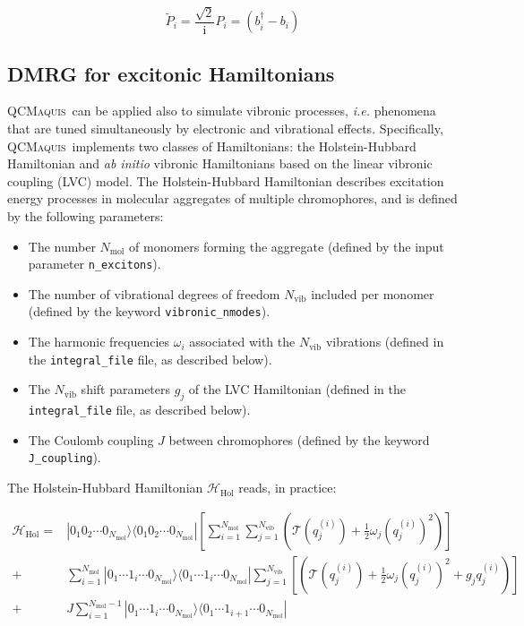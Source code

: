 \documentclass[bibliography=totoc,12pt,a4paper]{scrartcl}
\newcommand{\qcm}{\textsc{QCMaquis}}
\begin{document}
\begin{equation}
  \tilde{P}_i = \frac{\sqrt{2}}{\mathrm{i}} P_i = \left( b_i^\dagger - b_i \right)
  \label{eq:ScaledNM_Momentum}
\end{equation}

\subsection{DMRG for excitonic Hamiltonians}
\label{sec:excitonic}

\qcm\ can be applied also to simulate vibronic processes, \textit{i.e.} phenomena that are tuned simultaneously by electronic and vibrational effects.
Specifically, \qcm\ implements two classes of Hamiltonians: the Holstein-Hubbard Hamiltonian and \textit{ab initio} vibronic Hamiltonians based on the linear vibronic coupling (LVC) model.
The Holstein-Hubbard Hamiltonian describes excitation energy processes in molecular aggregates of multiple chromophores, and is defined by the following parameters:

\begin{itemize}
  \item The number $N_\text{mol}$ of monomers forming the aggregate (defined by the input parameter \texttt{n\_excitons}).
  \item The number of vibrational degrees of freedom $N_\text{vib}$ included per monomer (defined by the keyword \texttt{vibronic\_nmodes}).
  \item The harmonic frequencies $\omega_i$ associated with the $N_\text{vib}$ vibrations (defined in the \texttt{integral\_file} file, as described below).
  \item The $N_\text{vib}$ shift parameters $g_j$ of the LVC Hamiltonian (defined in the \texttt{integral\_file} file, as described below).
  \item The Coulomb coupling $J$ between chromophores (defined by the keyword \texttt{J\_coupling}).
\end{itemize}

The Holstein-Hubbard Hamiltonian $\mathcal{H}_\text{Hol}$ reads, in practice:

\begin{equation}
 \begin{aligned}
  \mathcal{H}_\text{Hol} =& | 0_1 0_2 \cdots 0_{N_\text{mol}} \rangle \langle 0_1 0_2 \cdots 0_{N_\text{mol}} |
	\left[ \sum_{i=1}^{N_\text{mol}} \sum_{j=1}^{N_\text{vib}} 
		   \left( \mathcal{T}(q_{j}^{(i)}) + \frac{1}{2} \omega_j \left( q_j^{(i)} \right)^2 \right)
	\right] \\
	+& \sum_{i=1}^{N_\text{mol}} | 0_1 \cdots 1_i \cdots 0_{N_\text{mol}} \rangle 
								 \langle 0_1 \cdots 1_i \cdots 0_{N_\text{mol}} | 
	   \sum_{j=1}^{N_\text{vib}} \left[ 
	   \left( \mathcal{T}(q_{j}^{(i)}) 
			+ \frac{1}{2} \omega_j \left( q_j^{(i)} \right)^2 + g_j q_{j}^{(i)} \right) 
	   \right] \\
    +& J \sum_{i=1}^{N_\text{mol}-1} | 0_1 \cdots 1_i \cdots 0_{N_\text{mol}} \rangle
	   								 \langle 0_1 \cdots 1_{i+1} \cdots 0_{N_\text{mol}} |
 \end{aligned}
 \label{eq:HolsteinHubbard}
\end{equation}
\end{document}
